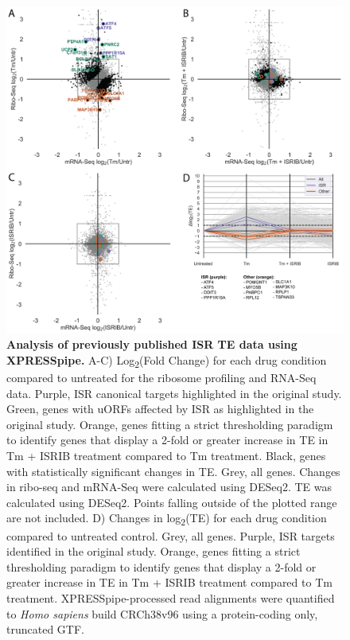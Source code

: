 \documentclass[10pt, oneside]{article}
\begin{document}
\begin{multicols}{2}
\begin{figure}
\centering
  \includegraphics[width=180mm]{figures/xpresspipe_figure3.png}
  \caption{\textbf{Analysis of previously published ISR TE data using XPRESSpipe.} A-C) Log\textsubscript{2}(Fold Change) for each drug condition compared to untreated for the ribosome profiling and RNA-Seq data. Purple, ISR canonical targets highlighted in the original study. Green, genes with uORFs affected by ISR as highlighted in the original study. Orange, genes fitting a strict thresholding paradigm to identify genes that display a 2-fold or greater increase in TE in Tm + ISRIB treatment compared to Tm treatment. Black, genes with statistically significant changes in TE. Grey, all genes. Changes in ribo-seq and mRNA-Seq were calculated using DESeq2. TE was calculated using DESeq2. Points falling outside of the plotted range are not included. D) Changes in log\textsubscript{2}(TE) for each drug condition compared to untreated control. Grey, all genes. Purple, ISR targets identified in the original study. Orange, genes fitting a strict thresholding paradigm to identify genes that display a 2-fold or greater increase in TE in Tm + ISRIB treatment compared to Tm treatment. XPRESSpipe-processed read alignments were quantified to \textit{Homo sapiens} build CRCh38v96 using a protein-coding only, truncated GTF.}
  \label{fig:figure3}
\end{figure}


\end{multicols}
\end{document}
